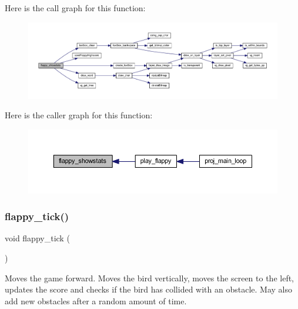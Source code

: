 Here is the call graph for this function\+:\nopagebreak
\begin{figure}[H]
\begin{center}
\leavevmode
\includegraphics[width=350pt]{group__flappy_ga2a15bc1d4bff96014dcaa54973162a48_cgraph}
\end{center}
\end{figure}
Here is the caller graph for this function\+:\nopagebreak
\begin{figure}[H]
\begin{center}
\leavevmode
\includegraphics[width=350pt]{group__flappy_ga2a15bc1d4bff96014dcaa54973162a48_icgraph}
\end{center}
\end{figure}
\mbox{\label{group__flappy_ga8efa272248ce46f0bb6081dcb680598d}} 
\subsubsection{\texorpdfstring{flappy\+\_\+tick()}{flappy\_tick()}}
{\footnotesize\ttfamily void flappy\+\_\+tick (\begin{DoxyParamCaption}{ }\end{DoxyParamCaption})}



Moves the game forward. Moves the bird vertically, moves the screen to the left, updates the score and checks if the bird has collided with an obstacle. May also add new obstacles after a random amount of time. 

